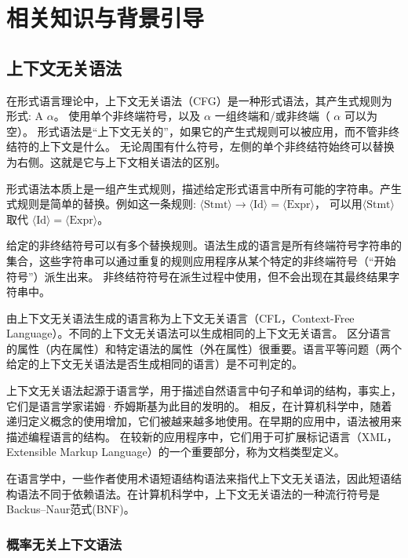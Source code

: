 
\chapter{相关知识与背景引导}


\section{上下文无关语法}

在形式语言理论中，上下文无关语法（CFG）是一种形式语法，其产生式规则为形式: A \rightarrow $\alpha$。 
使用单个非终端符号，以及 $\alpha$ 一组终端和/或非终端（ $\alpha$ 可以为空）。
形式语法是“上下文无关的”，如果它的产生式规则可以被应用，而不管非终结符的上下文是什么。
无论周围有什么符号，左侧的单个非终结符始终可以替换为右侧。这就是它与上下文相关语法的区别。

形式语法本质上是一组产生式规则，描述给定形式语言中所有可能的字符串。产生式规则是简单的替换。例如这一条规则: $\displaystyle \langle {\text{Stmt}}\rangle \to \langle {\text{Id}}\rangle =\langle {\text{Expr}}\rangle$，
可以用$\displaystyle \langle {\text{Stmt}}\rangle$ 取代 $\langle {\text{Id}}\rangle =\langle {\text{Expr}}\rangle$。

给定的非终结符号可以有多个替换规则。语法生成的语言是所有终端符号字符串的集合，这些字符串可以通过重复的规则应用程序从某个特定的非终端符号（“开始符号”）派生出来。
非终结符符号在派生过程中使用，但不会出现在其最终结果字符串中。

由上下文无关语法生成的语言称为上下文无关语言（CFL，Context-Free Language）。不同的上下文无关语法可以生成相同的上下文无关语言。
区分语言的属性（内在属性）和特定语法的属性（外在属性）很重要。语言平等问题（两个给定的上下文无关语法是否生成相同的语言）是不可判定的。

上下文无关语法起源于语言学，用于描述自然语言中句子和单词的结构，事实上，它们是语言学家诺姆·乔姆斯基为此目的发明的。
相反，在计算机科学中，随着递归定义概念的使用增加，它们被越来越多地使用。在早期的应用中，语法被用来描述编程语言的结构。
在较新的应用程序中，它们用于可扩展标记语言（XML， Extensible Markup Language）的一个重要部分，称为文档类型定义\cite{hopcroft2001introduction}。

在语言学中，一些作者使用术语短语结构语法来指代上下文无关语法，因此短语结构语法不同于依赖语法。在计算机科学中，上下文无关语法的一种流行符号是Backus–Naur范式(BNF)。

\subsection{概率无关上下文语法}

